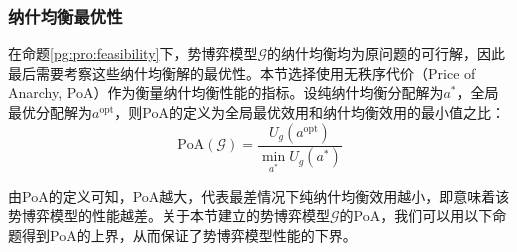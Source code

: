 \subsubsection{纳什均衡最优性}
\label{pg:mwlu:pgoptimal}

在命题\ref{pg:pro:feasibility}下，势博弈模型$\mathcal{G}$的纳什均衡均为原问题的可行解，因此最后需要考察这些纳什均衡解的最优性。本节选择使用无秩序代价（Price of Anarchy, PoA）作为衡量纳什均衡性能的指标。设纯纳什均衡分配解为$a^*$，全局最优分配解为$a^{\text{opt}}$，则PoA的定义为全局最优效用和纳什均衡效用的最小值之比：
\begin{equation}
\label{pg:eq:PoA}
	\mathrm{PoA}(\mathcal{G}) = \frac{U_g(a^{\text{opt}})}{\min_{a^*} U_g(a^*)}
\end{equation}

由PoA的定义可知，PoA越大，代表最差情况下纯纳什均衡效用越小，即意味着该势博弈模型的性能越差。关于本节建立的势博弈模型$\mathcal{G}$的PoA，我们可以用以下命题得到PoA的上界，从而保证了势博弈模型性能的下界。

